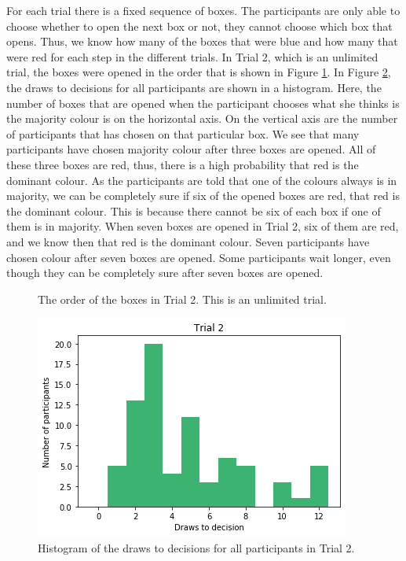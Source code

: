 For each trial there is a fixed sequence of boxes. The participants are only able to choose whether to open the next box or not, they cannot choose which box that opens. Thus, we know how many of the boxes that were blue and how many that were red for each step in the different trials. In Trial 2, which is an unlimited trial, the boxes were opened in the order that is shown in Figure \ref{fig:trial2_order}. In Figure \ref{fig:histogram_trial2}, the draws to decisions for all participants are shown in a histogram. Here, the number of boxes that are opened when the participant chooses what she thinks is the majority colour is on the horizontal axis. On the vertical axis are the number of participants that has chosen on that particular box. We see that many participants have chosen majority colour after three boxes are opened. All of these three boxes are red, thus, there is a high probability that red is the dominant colour. 
As the participants are told that one of the colours always is in majority, we can be completely sure if six of the opened boxes are red, that red is the dominant colour. This is because there cannot be six of each box if one of them is in majority. When seven boxes are opened in Trial 2, six of them are red, and we know then that red is the dominant colour. Seven participants have chosen colour after seven boxes are opened. Some participants wait longer, even though they can be completely sure after seven boxes are opened.
\begin{figure}
    \centering
    \scalebox{0.8}{}
    \caption[Order of Boxes in Trial 2]{The order of the boxes in Trial 2. This is an unlimited trial.}
    \label{fig:trial2_order}
\end{figure}


\begin{figure}
    \centering
    \includegraphics[scale=0.6]{pictures/dtd2_histogram.png}
    \caption[Draws to Decisions in Trial 2]{Histogram of the draws to decisions for all participants in Trial 2.}
    \label{fig:histogram_trial2}
\end{figure}


